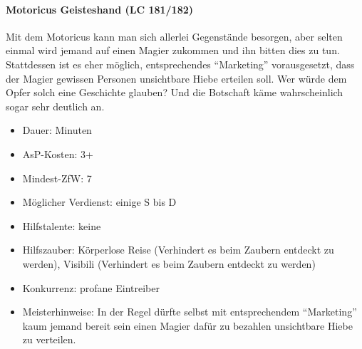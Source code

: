 \paragraph{Motoricus Geisteshand (LC 181/182)}
Mit dem Motoricus kann man sich allerlei Gegenstände besorgen, aber selten einmal wird jemand auf einen Magier zukommen und ihn bitten dies zu tun. Stattdessen ist es eher möglich, entsprechendes \enquote{Marketing} vorausgesetzt, dass der Magier gewissen Personen unsichtbare Hiebe erteilen soll. Wer würde dem Opfer solch eine Geschichte glauben? Und die Botschaft käme wahrscheinlich sogar sehr deutlich an.
\begin{itemize}
	\item Dauer: Minuten
	\item AsP-Kosten: 3+
	\item Mindest-ZfW: 7
	\item Möglicher Verdienst: einige S bis D
	\item Hilfstalente: keine
	\item Hilfszauber: Körperlose Reise (Verhindert es beim Zaubern entdeckt zu werden), Visibili (Verhindert es beim Zaubern entdeckt zu werden)
	\item Konkurrenz: profane Eintreiber
	\item Meisterhinweise: In der Regel dürfte selbst mit entsprechendem \enquote{Marketing} kaum jemand bereit sein einen Magier dafür zu bezahlen unsichtbare Hiebe zu verteilen.
\end{itemize}

